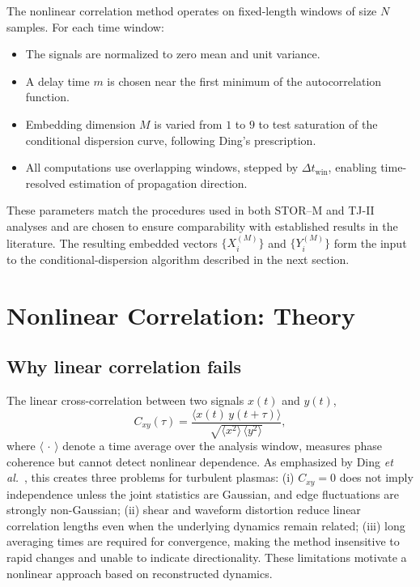 \documentclass[12pt]{article}
\begin{document}
The nonlinear correlation method operates on fixed-length windows of size $N$ samples. For each
time window:
\begin{itemize}
    \item The signals are normalized to zero mean and unit variance.
    \item A delay time $m$ is chosen near the first minimum of the autocorrelation function.
    \item Embedding dimension $M$ is varied from $1$ to $9$ to test saturation of the conditional
          dispersion curve, following Ding’s prescription.
    \item All computations use overlapping windows, stepped by $\Delta t_{\mathrm{win}}$,
          enabling time-resolved estimation of propagation direction.
\end{itemize}

These parameters match the procedures used in both STOR--M and TJ-II analyses
\cite{dingNonlinearRadialCorrelation1997,bsharatConditionalCrosscorrelationAnalysis2024} and are chosen to ensure comparability with established results in the literature. The resulting embedded vectors $\{X_i^{(M)}\}$ and $\{Y_i^{(M)}\}$ form the input to the conditional-dispersion algorithm described in the next section.

\section{ Nonlinear Correlation: Theory}

\subsection{Why linear correlation fails}

The linear cross-correlation between two signals \(x(t)\) and \(y(t)\),
\[
C_{xy}(\tau)
=
\frac{\langle x(t)\,y(t+\tau)\rangle}
{\sqrt{\langle x^{2}\rangle\,\langle y^{2}\rangle}},
\]
where $\langle\,\cdot\,\rangle$ denote a time average over the analysis window, measures phase coherence but cannot detect nonlinear dependence.
As emphasized by Ding \textit{et al.}\ \cite{dingNonlinearRadialCorrelation1997}, this creates three problems for turbulent plasmas:  
(i) \(C_{xy}=0\) does not imply independence unless the joint statistics are Gaussian, and edge fluctuations are strongly non-Gaussian;  
(ii) shear and waveform distortion reduce linear correlation lengths even when the underlying dynamics remain related;  
(iii) long averaging times are required for convergence, making the method insensitive to rapid changes and unable to indicate directionality.  
These limitations motivate a nonlinear approach based on reconstructed dynamics.
\end{document}
